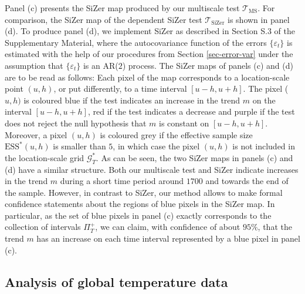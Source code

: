 Panel (c) presents the SiZer map produced by our multiscale test $\mathcal{T}_{\text{MS}}$. For comparison, the SiZer map of the dependent SiZer test $\mathcal{T}_{\text{SiZer}}$ is shown in panel (d). To produce panel (d), we implement SiZer as described in Section S.3 of the Supplementary Material, where the autocovariance function of the errors $\{\varepsilon_t\}$ is estimated with the help of our procedures from Section \ref{sec-error-var} under the assumption that $\{\varepsilon_t\}$ is an AR($2$) process. The SiZer maps of panels (c) and (d) are to be read as follows: Each pixel of the map corresponds to a location-scale point $(u,h)$, or put differently, to a time interval $[u-h,u+h]$. The pixel ($u,h)$ is coloured blue if the test indicates an increase in the trend $m$ on the interval $[u-h,u+h]$, red if the test indicates a decrease and purple if the test does not reject the null hypothesis that $m$ is constant on $[u-h,u+h]$. Moreover, a pixel $(u,h)$ is coloured grey if the effective sample size $\text{ESS}^*(u,h)$ is smaller than $5$, in which case the pixel $(u,h)$ is not included in the location-scale grid $\mathcal{G}_T^*$. As can be seen, the two SiZer maps in panels (c) and (d) have a similar structure. Both our multiscale test and SiZer indicate increases in the trend $m$ during a short time period around $1700$ and towards the end of the sample. However, in contrast to SiZer, our method allows to make formal confidence statements about the regions of blue pixels in the SiZer map. In particular, as the set of blue pixels in panel (c) exactly corresponds to the collection of intervals $\Pi_T^+$, we can claim, with confidence of about $95\%$, that the trend $m$ has an increase on each time interval represented by a blue pixel in panel (c). 


\subsection{Analysis of global temperature data}


